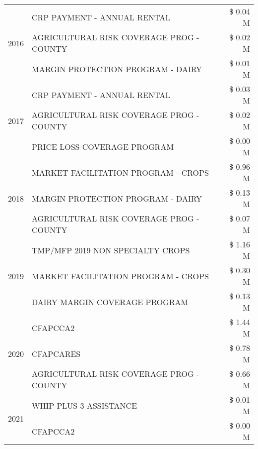 \begin{tabular}{llr}
\cline{1-3}
\multirow[t]{3}{*}{2016} & CRP PAYMENT - ANNUAL RENTAL & \$ 0.04 M \\
 & AGRICULTURAL RISK COVERAGE PROG - COUNTY & \$ 0.02 M \\
 & MARGIN PROTECTION PROGRAM - DAIRY & \$ 0.01 M \\
\cline{1-3}
\multirow[t]{3}{*}{2017} & CRP PAYMENT - ANNUAL RENTAL & \$ 0.03 M \\
 & AGRICULTURAL RISK COVERAGE PROG - COUNTY & \$ 0.02 M \\
 & PRICE LOSS COVERAGE PROGRAM & \$ 0.00 M \\
\cline{1-3}
\multirow[t]{3}{*}{2018} & MARKET FACILITATION PROGRAM - CROPS & \$ 0.96 M \\
 & MARGIN PROTECTION PROGRAM - DAIRY & \$ 0.13 M \\
 & AGRICULTURAL RISK COVERAGE PROG - COUNTY & \$ 0.07 M \\
\cline{1-3}
\multirow[t]{3}{*}{2019} & TMP/MFP 2019 NON SPECIALTY CROPS & \$ 1.16 M \\
 & MARKET FACILITATION PROGRAM - CROPS & \$ 0.30 M \\
 & DAIRY MARGIN COVERAGE PROGRAM & \$ 0.13 M \\
\cline{1-3}
\multirow[t]{3}{*}{2020} & CFAPCCA2 & \$ 1.44 M \\
 & CFAPCARES & \$ 0.78 M \\
 & AGRICULTURAL RISK COVERAGE PROG - COUNTY & \$ 0.66 M \\
\cline{1-3}
\multirow[t]{2}{*}{2021} & WHIP PLUS 3 ASSISTANCE & \$ 0.01 M \\
 & CFAPCCA2 & \$ 0.00 M \\
\cline{1-3}
\bottomrule
\end{tabular}
